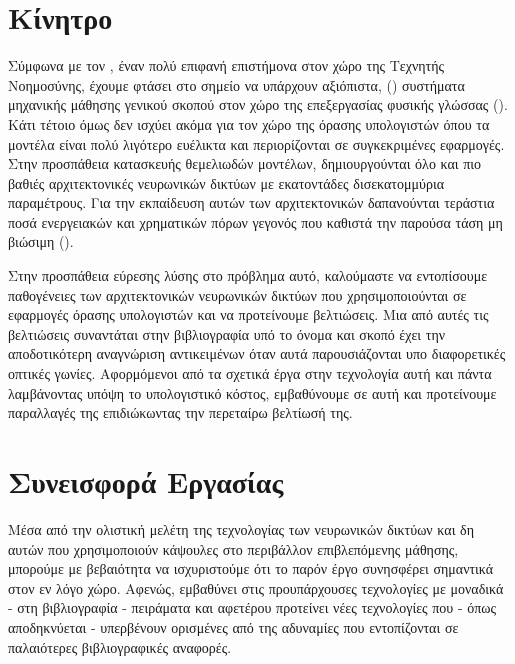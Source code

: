 \section{Κίνητρο}
Σύμφωνα με τον , έναν πολύ επιφανή επιστήμονα στον χώρο της Τεχνητής Νοημοσύνης, έχουμε φτάσει στο σημείο να υπάρχουν αξιόπιστα,  () συστήματα μηχανικής μάθησης γενικού σκοπού στον χώρο της επεξεργασίας φυσικής γλώσσας (). Κάτι τέτοιο όμως δεν ισχύει ακόμα για τον χώρο της όρασης υπολογιστών όπου τα μοντέλα είναι πολύ λιγότερο ευέλικτα και περιορίζονται σε συγκεκριμένες εφαρμογές\cite{anadiotis_2022}. Στην προσπάθεια κατασκευής θεμελιωδών μοντέλων, δημιουργούνται όλο και πιο βαθιές αρχιτεκτονικές νευρωνικών δικτύων με εκατοντάδες δισεκατομμύρια παραμέτρους. Για την εκπαίδευση αυτών των αρχιτεκτονικών δαπανούνται τεράστια ποσά ενεργειακών και χρηματικών πόρων γεγονός που καθιστά την παρούσα τάση μη βιώσιμη ().\par 
Στην προσπάθεια εύρεσης λύσης στο πρόβλημα αυτό, καλούμαστε να εντοπίσουμε παθογένειες των αρχιτεκτονικών νευρωνικών δικτύων που χρησιμοποιούνται σε εφαρμογές όρασης υπολογιστών και να προτείνουμε βελτιώσεις. Μια από αυτές τις βελτιώσεις συναντάται στην βιβλιογραφία υπό το όνομα  και σκοπό έχει την αποδοτικότερη αναγνώριση αντικειμένων όταν αυτά παρουσιάζονται υπο διαφορετικές οπτικές γωνίες. Αφορμόμενοι από τα σχετικά έργα στην τεχνολογία αυτή και πάντα λαμβάνοντας υπόψη το υπολογιστικό κόστος, εμβαθύνουμε σε αυτή και προτείνουμε παραλλαγές της επιδιώκωντας την περεταίρω βελτίωσή της.

\section{Συνεισφορά Εργασίας}
Μέσα από την ολιστική μελέτη της τεχνολογίας των νευρωνικών δικτύων και δη αυτών που χρησιμοποιούν κάψουλες στο περιβάλλον επιβλεπόμενης μάθησης, μπορούμε με βεβαιότητα να ισχυριστούμε ότι το παρόν έργο συνησφέρει σημαντικά στον εν λόγο χώρο. Αφενώς, εμβαθύνει στις προυπάρχουσες τεχνολογίες με μοναδικά - στη βιβλιογραφία - πειράματα και αφετέρου προτείνει νέες τεχνολογίες που - όπως αποδηκνύεται - υπερβένουν ορισμένες από της αδυναμίες που εντοπίζονται σε παλαιότερες βιβλιογραφικές αναφορές.\par

